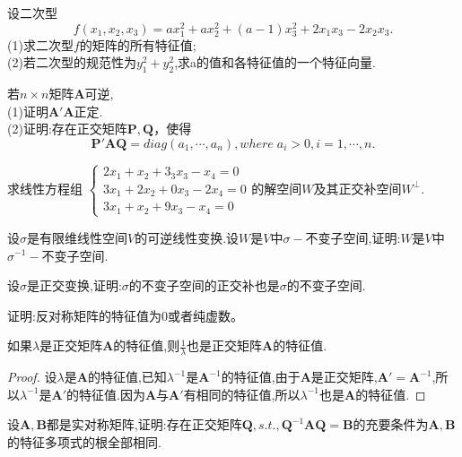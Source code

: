 \documentclass[lang=cn,11pt,normal]{elegantbook}
\begin{document}
	\begin{exercise}
		设二次型
		$$
		f(x_1,x_2,x_3)=ax_1^2+ax_2^2+(a-1)x_3^2+2x_1x_3-2x_2x_3.
		$$
		(1)求二次型$f$的矩阵的所有特征值;\\
		(2)若二次型的规范性为$y_1^2+y_2^2$,求a的值和各特征值的一个特征向量.
	\end{exercise}
	\begin{exercise}
		若$n\times n$矩阵$\boldsymbol{A}$可逆,\\
		(1)证明$\boldsymbol{A}'\boldsymbol{A}$正定.\\
		(2)证明:存在正交矩阵$\boldsymbol{P},\boldsymbol{Q}$，使得
		$$
		\boldsymbol{P}'\boldsymbol{AQ}=diag(a_1,\cdots,a_n),where \; a_i>0,i=1,\cdots,n.
		$$
	\end{exercise}
	\begin{exercise}
		求线性方程组
		$
		\begin{cases}
		2x_1+x_2+3_3x_3-x_4=0\\
		3x_1+2x_2+0x_3-2x_4=0\\
		3x_1+x_2+9x_3-x_4=0
		\end{cases}
		$的解空间$W$及其正交补空间$W^{\perp}$.
	\end{exercise}
	\begin{exercise}
		设$\sigma$是有限维线性空间$V$的可逆线性变换.设$W$是$V$中$\sigma-$不变子空间,证明:$W$是$V$中$\sigma^{-1}-$不变子空间.
	\end{exercise}
	\begin{exercise}
		设$\sigma$是正交变换,证明:$\sigma$的不变子空间的正交补也是$\sigma$的不变子空间.
	\end{exercise}
	\begin{exercise}
		证明:反对称矩阵的特征值为0或者纯虚数。
	\end{exercise}
	\begin{exercise}
		如果$\lambda$是正交矩阵$\boldsymbol{A}$的特征值,则$\frac{1}{\lambda}$也是正交矩阵$\boldsymbol{A}$的特征值.
	\end{exercise}
	\begin{proof}
		设$\lambda$是$\boldsymbol{A}$的特征值,已知$\lambda^{-1}$是$\boldsymbol{A}^{-1}$的特征值,由于$\boldsymbol{A}$是正交矩阵,$\boldsymbol{A}'=\boldsymbol{A}^{-1}$,所以$\lambda^{-1}$是$\boldsymbol{A}'$的特征值.因为$\boldsymbol{A}$与$\boldsymbol{A}'$有相同的特征值,所以$\lambda^{-1}$也是$\boldsymbol{A}$的特征值.
	\end{proof}
	\begin{exercise}
		设$\boldsymbol{A},\boldsymbol{B}$都是实对称矩阵,证明:存在正交矩阵$\boldsymbol{Q},s.t.,\boldsymbol{Q}^{-1}\boldsymbol{AQ}=\boldsymbol{B}$的充要条件为$\boldsymbol{A},\boldsymbol{B}$的特征多项式的根全部相同.
	\end{exercise}
\end{document}
